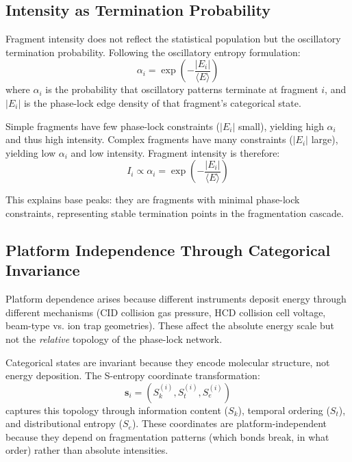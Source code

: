 \documentclass[twocolumn,10pt,a4paper]{article}
\theoremstyle{definition}
\theoremstyle{remark}
\begin{document}
\subsection{Intensity as Termination Probability}

Fragment intensity does not reflect the statistical population but the oscillatory termination probability. Following the oscillatory entropy formulation:
\begin{equation}
\alpha_i = \exp\left(-\frac{|E_i|}{\langle E \rangle}\right)
\label{eq:termination_prob}
\end{equation}
where $\alpha_i$ is the probability that oscillatory patterns terminate at fragment $i$, and $|E_i|$ is the phase-lock edge density of that fragment's categorical state.

Simple fragments have few phase-lock constraints ($|E_i|$ small), yielding high $\alpha_i$ and thus high intensity. Complex fragments have many constraints ($|E_i|$ large), yielding low $\alpha_i$ and low intensity. Fragment intensity is therefore:
\begin{equation}
I_i \propto \alpha_i = \exp\left(-\frac{|E_i|}{\langle E \rangle}\right)
\label{eq:intensity_formula}
\end{equation}

This explains base peaks: they are fragments with minimal phase-lock constraints, representing stable termination points in the fragmentation cascade.


\subsection{Platform Independence Through Categorical Invariance}

Platform dependence arises because different instruments deposit energy through different mechanisms (CID collision gas pressure, HCD collision cell voltage, beam-type vs. ion trap geometries). These affect the absolute energy scale but not the \emph{relative} topology of the phase-lock network.

Categorical states are invariant because they encode molecular structure, not energy deposition. The S-entropy coordinate transformation:
\begin{equation}
\mathbf{s}_i = (S_k^{(i)}, S_t^{(i)}, S_e^{(i)})
\end{equation}
captures this topology through information content ($S_k$), temporal ordering ($S_t$), and distributional entropy ($S_e$). These coordinates are platform-independent because they depend on fragmentation patterns (which bonds break, in what order) rather than absolute intensities.
\end{document}
